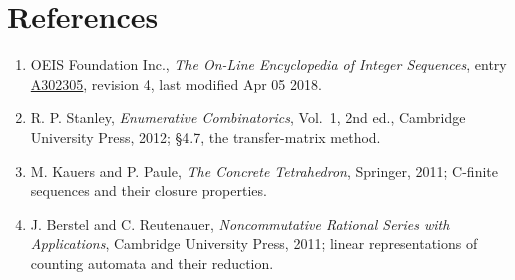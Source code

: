 \documentclass[11pt]{article}
\theoremstyle{definition}
\begin{document}
\section{References}

\begin{enumerate}

\item OEIS Foundation Inc., \emph{The On-Line Encyclopedia of Integer Sequences}, entry \href{https://oeis.org/A302305}{A302305}, revision 4, last modified Apr 05 2018.

\item R. P. Stanley, \emph{Enumerative Combinatorics}, Vol.~1, 2nd ed., Cambridge University Press, 2012; \S4.7, the transfer-matrix method.

\item M. Kauers and P. Paule, \emph{The Concrete Tetrahedron}, Springer, 2011; C-finite sequences and their closure properties.

\item J. Berstel and C. Reutenauer, \emph{Noncommutative Rational Series with Applications}, Cambridge University Press, 2011; linear representations of counting automata and their reduction.

\end{enumerate}
\end{document}
